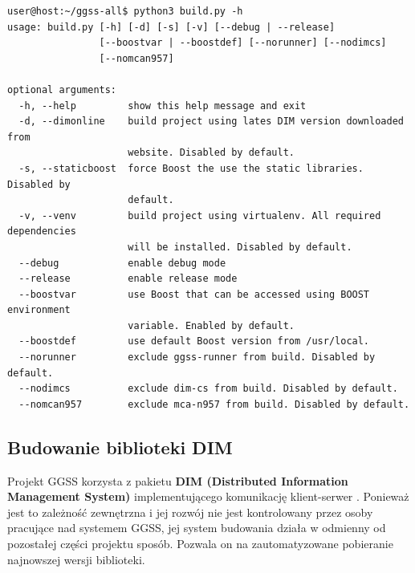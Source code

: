 \begin{lstlisting}[language=Cmd, caption={Użycie skryptu \textit{build.py} z opcją \textit{-h} powodujące wyświetlenie możliwych do wykorzystania parametrów. Widoczne m.in. parametry \textit{nomcan957}, \textit{nodimcs} oraz \textit{norunner} pozwalające użytkownikowi na wykluczenie niektórych aplikacji wchodzących w skład projektu GGSS z procesu budowania.}, label={lst:buildpy2}]
user@host:~/ggss-all$ python3 build.py -h
usage: build.py [-h] [-d] [-s] [-v] [--debug | --release]
                [--boostvar | --boostdef] [--norunner] [--nodimcs]
                [--nomcan957]

optional arguments:
  -h, --help         show this help message and exit
  -d, --dimonline    build project using lates DIM version downloaded from
                     website. Disabled by default.
  -s, --staticboost  force Boost the use the static libraries. Disabled by
                     default.
  -v, --venv         build project using virtualenv. All required dependencies
                     will be installed. Disabled by default.
  --debug            enable debug mode
  --release          enable release mode
  --boostvar         use Boost that can be accessed using BOOST environment
                     variable. Enabled by default.
  --boostdef         use default Boost version from /usr/local.
  --norunner         exclude ggss-runner from build. Disabled by default.
  --nodimcs          exclude dim-cs from build. Disabled by default.
  --nomcan957        exclude mca-n957 from build. Disabled by default.

\end{lstlisting}


\subsection{Budowanie biblioteki DIM}
Projekt GGSS korzysta z pakietu \textbf{DIM (Distributed Information Management System)} implementującego komunikację klient-serwer \cite{DIMwebsite}. Ponieważ jest to zależność zewnętrzna i jej rozwój nie jest kontrolowany przez osoby pracujące nad systemem GGSS, jej system budowania działa w odmienny od pozostałej części projektu sposób. Pozwala on na zautomatyzowane pobieranie najnowszej wersji biblioteki.

